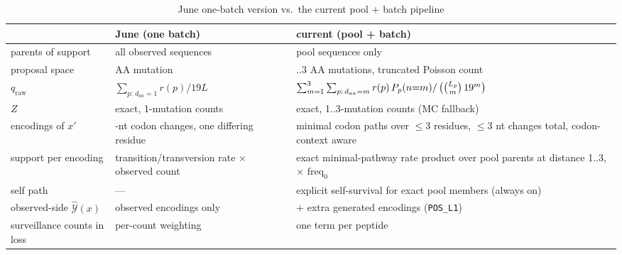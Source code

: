 \documentclass[11pt]{article}
\begin{document}
\begin{table}[htbp]
\centering
\caption{June one-batch version vs.\ the current pool + batch pipeline}
\label{tab:diffs}
{\footnotesize
\begin{tabular}{@{}>{\raggedright\arraybackslash}p{3.0cm}>{\raggedright\arraybackslash}p{4.4cm}>{\raggedright\arraybackslash}p{6.9cm}@{}}
\toprule
 & June (one batch) & current (pool + batch) \\
\midrule
parents of support & all observed sequences & pool sequences only \\
proposal space & 1 AA mutation & 1..3 AA mutations, truncated Poisson
count \\
$q_{\text{raw}}$ & $\sum_{p:\,d_{aa}=1} r(p)/19L$ &
$\sum_{m=1}^{3}\sum_{p:\,d_{aa}=m} r(p)\, P_p(n{=}m) \newline
/\, \big(\binom{L_p}{m}\, 19^{m}\big)$ \\
$Z$ & exact, 1-mutation counts & exact, 1..3-mutation counts (MC
fallback) \\
encodings of $x'$ & 1-nt codon changes, one differing residue & minimal
codon paths over $\le 3$ residues, $\le 3$ nt changes total,
codon-context aware \\
support per encoding & transition/transversion rate $\times$ observed
count & exact minimal-pathway rate product over pool parents at
distance 1..3, $\times$ $\text{freq}_0$ \\
self path & --- & explicit self-survival for exact pool members (always
on) \\
observed-side $\hat{\mathcal{Y}}(x)$ & observed encodings only & $+$
extra generated encodings (\texttt{POS\_L1}) \\
surveillance counts in loss & per-count weighting & one term per
peptide \\
\bottomrule
\end{tabular}
}
\end{table}
\end{document}
